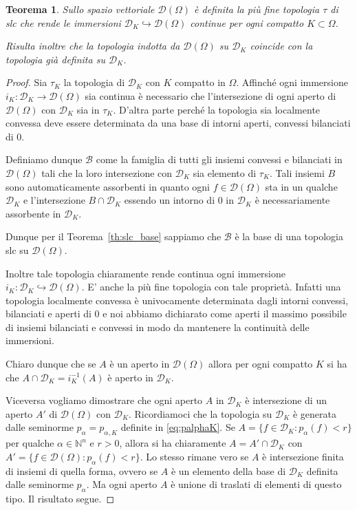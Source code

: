 \documentclass[italian,a4paper,oneside,headinclude]{scrbook}
\newcommand{\B}{\mathcal B}
\newcommand{\D}{\mathcal D}
\newcommand{\NN}{\mathbb N}
\newtheorem{theorem}{Teorema}
\begin{document}
\begin{theorem}
  Sullo spazio vettoriale $\D(\Omega)$ è definita
  la più fine topologia $\tau$ di slc che rende le immersioni
  $\D_K  \hookrightarrow \D(\Omega)$ continue per ogni compatto
  $K\subset \Omega$.

  Risulta inoltre che la topologia indotta da $\D(\Omega)$ su $\D_K$
  coincide con la topologia già definita su $\D_K$.
\end{theorem}
%
\begin{proof}
  Sia $\tau_K$ la topologia di $\D_K$ con $K$ compatto in $\Omega$.
  Affinché ogni immersione
  $i_K\colon \D_K \to \D(\Omega)$
  sia continua è necessario che l'intersezione di ogni aperto di
  $\D(\Omega)$ con $\D_K$ sia in $\tau_K$. D'altra parte perché la
  topologia sia localmente convessa deve essere determinata da una
  base di intorni aperti, convessi bilanciati di $0$.

  Definiamo dunque $\B$
  come la famiglia di tutti gli insiemi
  convessi e bilanciati in $\D(\Omega)$ tali che la loro intersezione
  con $\D_K$ sia elemento di $\tau_K$. Tali insiemi $B$ sono
  automaticamente assorbenti in quanto ogni $f\in \D(\Omega)$ sta in
  un qualche $\D_K$ e l'intersezione $B\cap \D_K$ essendo un intorno
  di $0$ in $\D_K$ è necessariamente assorbente in $\D_K$.

  Dunque per il Teorema~\ref{th:slc_base} sappiamo che $\B$ è la base di una
  topologia slc su $\D(\Omega)$.

  Inoltre tale topologia chiaramente
  rende continua ogni immersione
  $i_K\colon \D_K \hookrightarrow \D(\Omega)$.
  E' anche la più fine topologia con tale proprietà. Infatti una
  topologia localmente convessa è univocamente determinata dagli
  intorni convessi, bilanciati e aperti di $0$ e noi abbiamo
  dichiarato come aperti il massimo possibile di insiemi bilanciati e
  convessi in modo da mantenere la continuità delle immersioni.

  Chiaro dunque che se $A$ è un aperto in $\D(\Omega)$ allora per ogni
  compatto $K$ si ha che $A\cap \D_K=i_K^{-1}(A)$
  è aperto in $\D_K$.

  Viceversa vogliamo dimostrare che ogni aperto $A$ in $\D_K$ è
  intersezione di un aperto $A'$ di $\D(\Omega)$ con $\D_K$.
  Ricordiamoci che la topologia su $\D_K$ è generata dalle seminorme
  $p_\alpha = p_{\alpha,K}$ definite in \eqref{eq:palphaK}. Se
  $A=\{f\in \D_K\colon p_\alpha(f)< r\}$ per qualche $\alpha\in\NN^n$
  e $r>0$, allora si ha chiaramente $A=A'\cap \D_K$ con
  $A'=\{f\in  \D(\Omega)\colon p_\alpha(f)< r\}$.
  Lo stesso rimane vero se $A$ è intersezione finita di insiemi di
  quella forma, ovvero se $A$ è un elemento della base di $\D_K$
  definita dalle seminorme $p_\alpha$. Ma ogni aperto $A$ è unione di
  traslati di elementi di questo tipo. Il risultato segue.

\end{proof}
\end{document}
